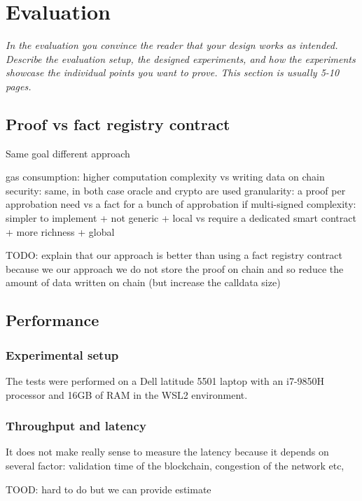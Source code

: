\documentclass[a4paper,11pt,oneside]{report}
\begin{document}
\chapter{Evaluation}

\textit{In the evaluation you convince the reader that your design works as intended.
Describe the evaluation setup, the designed experiments, and how the
experiments showcase the individual points you want to prove.
This section is usually 5-10 pages.} \\

\section{Proof vs fact registry contract}
Same goal different approach

gas consumption: higher computation complexity vs writing data on chain
security: same, in both case oracle and crypto are used
granularity: a proof per approbation need vs a fact for a bunch of approbation if multi-signed
complexity: simpler to implement + not generic + local vs require a dedicated smart contract + more richness + global




TODO: explain that our approach is better than using a fact registry contract because we our approach we do not store the proof on chain and so reduce the amount of data written on chain (but increase the calldata size)

\section{Performance}

\subsection{Experimental setup}
The tests were performed on a Dell latitude 5501 laptop with an i7-9850H processor and 16GB of RAM in the WSL2 environment.

\subsection{Throughput and latency}


It does not make really sense to measure the latency because it depends on several factor: validation time of the blockchain, congestion of the network etc,

TOOD: hard to do but we can provide estimate
\end{document}
